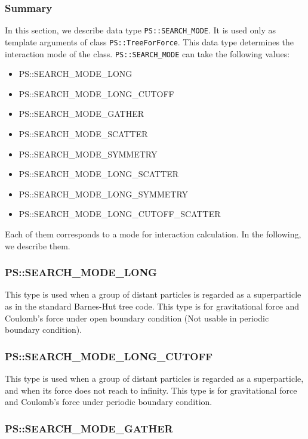\subsubsection{Summary}

In this section, we describe data type \texttt{PS::SEARCH\_MODE}.
It is used only as template arguments of class \texttt{PS::TreeForForce}.
This data type determines the interaction mode of the class.
\texttt{PS::SEARCH\_MODE} can take the following values:
\begin{itemize}[leftmargin=*,itemsep=-1ex]
\item PS::SEARCH\_MODE\_LONG
\item PS::SEARCH\_MODE\_LONG\_CUTOFF
\item PS::SEARCH\_MODE\_GATHER
\item PS::SEARCH\_MODE\_SCATTER
\item PS::SEARCH\_MODE\_SYMMETRY
\item PS::SEARCH\_MODE\_LONG\_SCATTER
\item PS::SEARCH\_MODE\_LONG\_SYMMETRY
\item PS::SEARCH\_MODE\_LONG\_CUTOFF\_SCATTER
\end{itemize}

Each of them corresponds to a mode for interaction calculation.
In the following, we describe them.

\subsubsection{PS::SEARCH\_MODE\_LONG}

This type is used when a group of distant particles is regarded as a
superparticle as in the standard Barnes-Hut tree code.
This type is for gravitational force and Coulomb's force under open boundary condition (Not usable in periodic boundary condition).

\subsubsection{PS::SEARCH\_MODE\_LONG\_CUTOFF}

This type is used when a group of distant particles is regarded as a
superparticle, and when its force does not reach to infinity.  This
type is for gravitational force and Coulomb's force under
periodic boundary condition.

\subsubsection{PS::SEARCH\_MODE\_GATHER}

